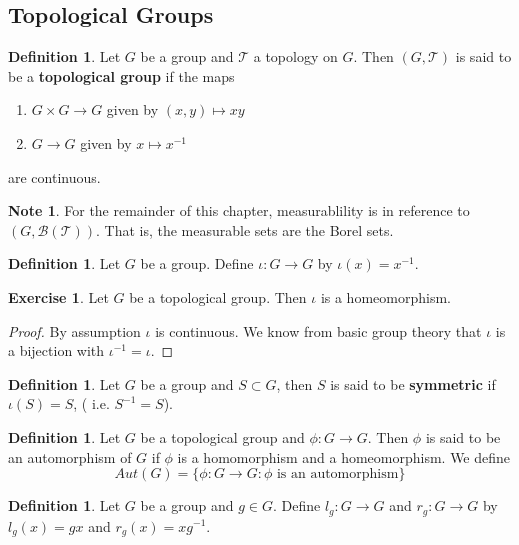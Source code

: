\documentclass[12pt]{amsart}
\theoremstyle{definition}
\newtheorem{defn}[definition]{Definition}
\newtheorem{note}[definition]{Note}
\newtheorem{ex}[definition]{Exercise}
\newcommand{\MB}{\mathcal{B}}
\newcommand{\MT}{\mathcal{T}}
\begin{document}
	\subsection{Topological Groups}
	\begin{defn}
		Let $G$ be a group and $\MT$ a topology on $G$. Then $(G, \MT)$ is said to be a \textbf{topological group} if the maps \begin{enumerate}
			\item $G \times G \rightarrow G$ given by $(x,y) \mapsto xy$
			\item  $G \rightarrow G$ given by $x \mapsto x^{-1}$ 
		\end{enumerate} are continuous.
	\end{defn}

	\begin{note}
		For the remainder of this chapter, measurablility is in reference to $(G, \MB(\MT))$. That is, the measurable sets are the Borel sets.
	\end{note}
	
	\begin{defn}
		Let $G$ be a group. Define $\iota:G \rightarrow G$ by $\iota(x) = x^{-1}$. 
	\end{defn}
	
	\begin{ex}
		Let $G$ be a topological group. Then $\iota$ is a homeomorphism.
	\end{ex}

	\begin{proof}
		By assumption $\iota$ is continuous. We know from basic group theory that $\iota$ is a bijection with $\iota^{-1} = \iota$. 
	\end{proof}

	\begin{defn}
		Let $G$ be a group and $S \subset G$, then $S$ is said to be \textbf{symmetric} if $\iota(S) = S$, ( i.e. $S^{-1} = S$).
	\end{defn}
	
	\begin{defn}
		Let $G$ be a topological group and $\phi:G \rightarrow G$. Then $\phi$ is said to be an automorphism of $G$ if $\phi$ is a homomorphism and a homeomorphism. We define $$Aut(G) = \{\phi:G \rightarrow G: \phi \text{ is an automorphism}\}$$
	\end{defn}
	
	\begin{defn}
		Let $G$ be a group and $g \in G$. Define $l_g:G \rightarrow G$ and $r_g:G \rightarrow G$ by $l_g(x) = gx$ and $r_g(x) = xg^{-1}$. 
	\end{defn}
	
\end{document}
